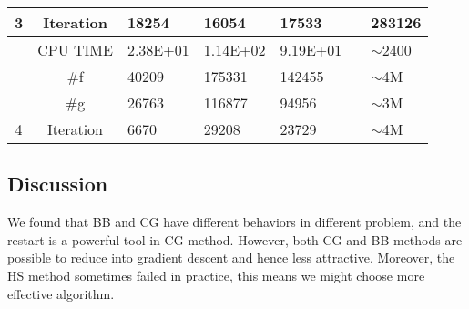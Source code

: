 \documentclass{article}
\begin{document}
\begin{table}[H]
\begin{tabular}{|c|c|l|l|l|l|l|}
		\multirow{-4}{*}{3} & Iteration & {\color[HTML]{000000} 18254}    & {\color[HTML]{000000} 16054}    & {\color[HTML]{000000} 17533}    & {\color[HTML]{000000} } & {\color[HTML]{000000} 283126}     \\ \hline
		& CPU TIME  & {\color[HTML]{000000} 2.38E+01} & {\color[HTML]{000000} 1.14E+02} & {\color[HTML]{000000} 9.19E+01} & {\color[HTML]{000000} } & {\color[HTML]{000000} $\sim$2400} \\ \cline{2-7} 
		& \#f       & {\color[HTML]{000000} 40209}    & {\color[HTML]{000000} 175331}   & {\color[HTML]{000000} 142455}   & {\color[HTML]{000000} } & {\color[HTML]{000000} $\sim$4M}   \\ \cline{2-7} 
		& \#g       & {\color[HTML]{000000} 26763}    & {\color[HTML]{000000} 116877}   & {\color[HTML]{000000} 94956}    & {\color[HTML]{000000} } & {\color[HTML]{000000} $\sim$3M}   \\ \cline{2-7} 
		\multirow{-4}{*}{4} & Iteration & {\color[HTML]{000000} 6670}     & {\color[HTML]{000000} 29208}    & {\color[HTML]{000000} 23729}    & {\color[HTML]{000000} } & {\color[HTML]{000000} $\sim$4M}   \\ \hline
	\end{tabular}
\end{table}
\subsection{Discussion}
We found that BB and CG have different behaviors in different problem, and the restart is a powerful tool in CG method. However, both CG and BB methods are possible to reduce into gradient descent and hence less attractive. Moreover, the HS method sometimes failed in practice, this means we might choose more effective algorithm.
\end{document}
